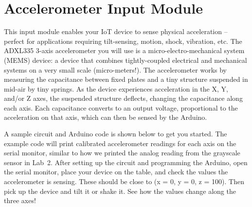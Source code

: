 
\clearpage
\section{Accelerometer Input Module}
\label{sec-input-accel}

This input module enables your IoT device to sense physical acceleration
-- perfect for applications requiring tilt-sensing, motion, shock,
vibration, etc. The ADXL335 3-axis accelerometer you will use is a
micro-electro-mechanical system (MEMS) device: a device that combines
tightly-coupled electrical and mechanical systems on a very small scale
(micro-meters!). The accelerometer works by measuring the capacitance
between fixed plates and a tiny structure suspended in mid-air by tiny
springs. As the device experiences acceleration in the X, Y, and/or Z
axes, the suspended structure deflects, changing the capacitance along
each axis. Each capacitance converts to an output voltage, proportional
to the acceleration on that axis, which can then be sensed by the
Arduino.

A sample circuit and Arduino code is shown below to get you started.
The example code will print calibrated accelerometer readings for each
axis on the serial monitor, similar to how we printed the analog reading
from the grayscale sensor in Lab~2. After setting up the circuit and
programming the Arduino, open the serial monitor, place your device on
the table, and check the values the accelerometer is sensing. These
should be close to (x = 0, y = 0, z = 100). Then pick up the device and
tilt it or shake it. See how the values change along the three axes!

